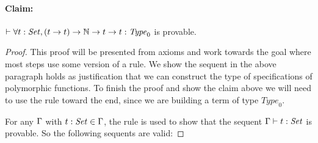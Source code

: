 \paragraph{Claim:} $\vdash \forall t : \mathit{Set}, (t \rightarrow t) \rightarrow \mathbb{N}{} \rightarrow t \rightarrow t : \mathit{Type}_0$ is provable.

\begin{proof}


This proof will be presented from axioms and work towards the goal where most steps use some version of a  rule. We show the sequent in the above paragraph holds as justification that we can construct the type of specifications of polymorphic functions. To finish the proof and show the claim above we will need to use the  rule toward the end, since we are building a term of type $\mathit{Type}_0$.

For any $\Gamma{}$ with $t : \mathit{Set} \in \Gamma{}$, the  rule is used to show that the sequent $\Gamma{} \vdash t : \mathit{Set}$ is provable. So the following sequents are valid:


\end{proof}
